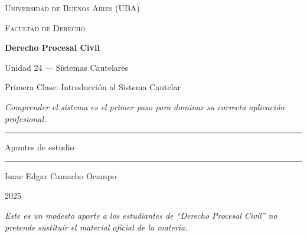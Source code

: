 \documentclass[12pt,oneside]{book}
\newcommand{\universidad}{Universidad de Buenos Aires (UBA)}
\newcommand{\facultad}{Facultad de Derecho}
\newcommand{\materia}{Derecho Procesal Civil}
\newcommand{\titulo}{Unidad 24 --- Sistemas Cautelares}
\newcommand{\subtitulo}{Primera Clase: Introducción al Sistema Cautelar}
\newcommand{\autor}{Isaac Edgar Camacho Ocampo}
\newcommand{\anio}{2025}
\begin{document}
\begin{titlepage}

\thispagestyle{empty}

\begin{center}

\vspace*{1cm}

{\large \textsc{\universidad}}

\vspace{0.2cm}

{\large \textsc{\facultad}}

\vspace{3cm}

{\Huge \textbf{\materia}}

\vspace{1cm}

{\LARGE \titulo}

\vspace{0.3cm}

{\large \subtitulo}

\vspace{0.8cm}

\textit{Comprender el sistema es el primer paso para dominar su correcta aplicación profesional.}

\vspace{1.2cm}

\rule{0.70\textwidth}{0.5pt}

\vspace{0.5cm}

{\large Apuntes de estudio}

\vspace{0.5cm}

\rule{0.70\textwidth}{0.5pt}

\vfill

{\large \autor}

\vspace{0.3cm}

{\large \anio}

\end{center}

\vfill

\begin{flushleft}
\textit{Este es un modesto aporte a los estudiantes de ``Derecho Procesal Civil'' no pretende sustituir el material oficial de la materia.}
\end{flushleft}

\end{titlepage}
\end{document}
